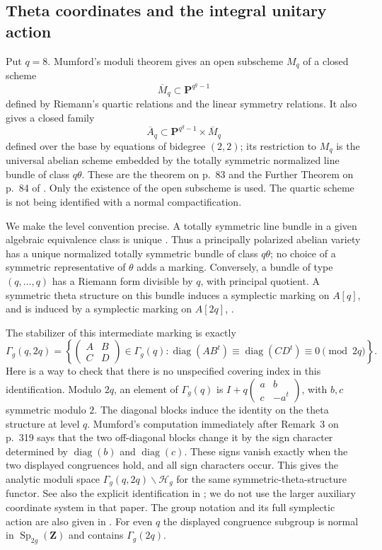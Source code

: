 \documentclass[11pt]{article}
\theoremstyle{definition}
\theoremstyle{remark}
\newcommand{\C}{\mathbf C}
\begin{document}
\subsection{Theta coordinates and the integral unitary action}

Put $q=8$.  Mumford's moduli theorem gives an open subscheme
$M_q$ of a closed scheme
\[
 \overline M_q\subset\mathbf P^{q^g-1}
\]
defined by Riemann's quartic relations and the linear symmetry
relations.  It also gives a closed family
\[
 \overline A_q\subset\mathbf P^{q^g-1}\times\overline M_q
\]
defined over the base by equations of bidegree $(2,2)$; its
restriction to $M_q$ is the universal abelian scheme embedded
by the totally symmetric normalized line bundle of class
$q\theta$.  These are the theorem on p.~83 and the Further
Theorem on p.~84 of \cite{Mumford1967II}.  Only the existence of
the open subscheme is used.  The quartic scheme is not being
identified with a normal compactification.

We make the level convention precise.  A totally symmetric line
bundle in a given algebraic equivalence class is unique
\cite[p.~307]{Mumford1966I}.  Thus a principally polarized
abelian variety has a unique normalized totally symmetric bundle
of class $q\theta$; no choice of a symmetric representative of
$\theta$ adds a marking.  Conversely, a bundle of type
$(q,\ldots,q)$ has a Riemann form divisible by $q$, with
principal quotient.  A symmetric theta structure on this bundle
induces a symplectic marking on $A[q]$, and is induced by a
symplectic marking on $A[2q]$,
\cite[\S2, Remarks~2--4, pp.~318--320]{Mumford1966I}.

The stabilizer of this intermediate marking is exactly
\[
 \Gamma_g(q,2q)=
 \left\{\begin{pmatrix}A&B\\C&D\end{pmatrix}\in\Gamma_g(q):
 \operatorname{diag}(AB^t)\equiv
 \operatorname{diag}(CD^t)\equiv0\pmod{2q}\right\}.
\]
Here is a way to check that there is no unspecified covering
index in this identification.  Modulo $2q$, an element of
$\Gamma_g(q)$ is $I+q\left(\begin{smallmatrix}a&b\\c&-a^t
\end{smallmatrix}\right)$, with $b,c$ symmetric modulo $2$.
The diagonal blocks induce the identity on the theta structure
at level $q$.  Mumford's computation immediately after
Remark~3 on p.~319 says that the two off-diagonal blocks change
it by the sign character determined by
$\operatorname{diag}(b)$ and $\operatorname{diag}(c)$.
These signs vanish exactly when the two displayed congruences
hold, and all sign characters occur.  This gives the analytic
moduli space $\Gamma_g(q,2q)\backslash\mathcal H_g$ for the
same symmetric-theta-structure functor.  See also the explicit
identification in \cite[\S8A, p.~199]{LeFourn2019}; we do not
use the larger auxiliary coordinate system in that paper.
The group notation and its full symplectic action are also
given in \cite[\S1, p.~3]{FreitagSalvatiManni2016}.
For even $q$ the displayed congruence subgroup is normal in
$\operatorname{Sp}_{2g}(\mathbf Z)$ and contains
$\Gamma_g(2q)$.
\end{document}
